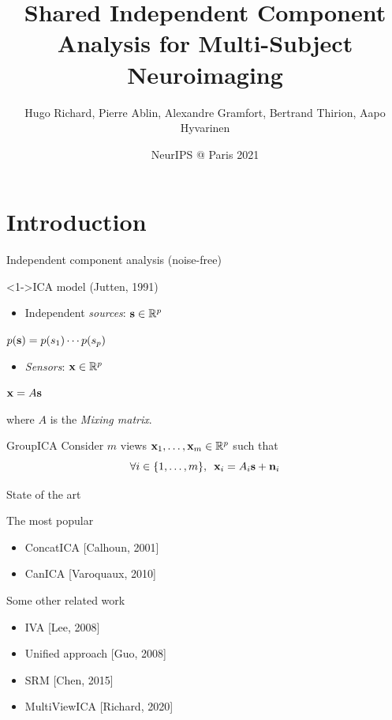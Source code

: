 \documentclass[bigger]{beamer}
\author[Hugo Richard \emph{et al.}]{Hugo Richard, Pierre Ablin,  Alexandre Gramfort, Bertrand Thirion, Aapo Hyvarinen}
\date{NeurIPS @ Paris 2021}
\title[ShICA]{Shared Independent Component Analysis for Multi-Subject Neuroimaging}
\begin{document}
\maketitle

\section{Introduction}
\begin{frame}[label={sec:org3d37d88}]{Independent component analysis (noise-free)}
\begin{block}<1->{ICA model (Jutten, 1991)}
\begin{itemize}
\item Independent \emph{sources}: \(\mathbf{s} \in \mathbb{R}^{p}\)
\end{itemize}
\(p(\mathbf{s}) = p(s_1) \cdots p(s_p)\)
\begin{itemize}
\item \emph{\emph{Sensors}}: \(\mathbf{x} \in \mathbb{R}^{p}\)
\end{itemize}

\centering
\emph{\emph{\(\mathbf{x} = A\mathbf{s}\)}}

where \(A\) is the \emph{Mixing matrix}. 
\end{block}

\begin{block}{GroupICA}
  Consider $m$ views \(\mathbf{x}_1, \dots, \mathbf{x}_m \in \mathbb{R}^p\) such that \\
  \[
    \forall i \in \{1, \dots, m\}, \enspace \mathbf{x}_i = A_i \mathbf{s} + \mathbf{n}_i
  \]
\end{block}
\end{frame}

\begin{frame}{State of the art}
  \begin{block}{The most popular}
    \begin{itemize}
    \item ConcatICA [Calhoun, 2001]
    \item CanICA [Varoquaux, 2010]
    \end{itemize}
  \end{block}

  \begin{block}{Some other related work}
    \begin{itemize}
    \item IVA [Lee, 2008] 
    \item Unified approach [Guo, 2008] 
    \item SRM [Chen, 2015] 
      \item MultiViewICA [Richard, 2020]
    \end{itemize}
  \end{block}
\end{frame}
\end{document}
